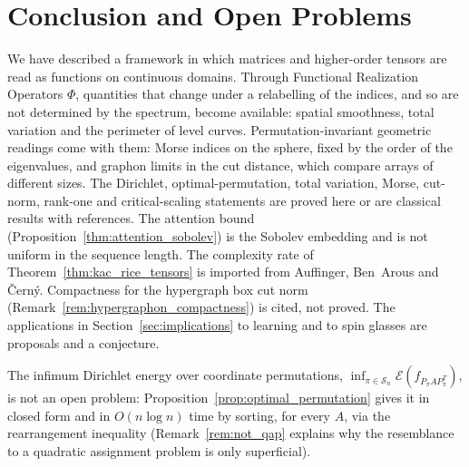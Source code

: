 \documentclass[11pt,a4paper,reqno]{amsart}
\theoremstyle{definition}
\numberwithin{equation}{section}
\begin{document}
\section{Conclusion and Open Problems}
\label{sec:conclusion}

We have described a framework in which matrices and higher-order tensors are read as functions on continuous domains. Through Functional Realization Operators $\Phi$, quantities that change under a relabelling of the indices, and so are not determined by the spectrum, become available: spatial smoothness, total variation and the perimeter of level curves. Permutation-invariant geometric readings come with them: Morse indices on the sphere, fixed by the order of the eigenvalues, and graphon limits in the cut distance, which compare arrays of different sizes. The Dirichlet, optimal-permutation, total variation, Morse, cut-norm, rank-one and critical-scaling statements are proved here or are classical results with references. The attention bound (Proposition~\ref{thm:attention_sobolev}) is the Sobolev embedding and is not uniform in the sequence length. The complexity rate of Theorem~\ref{thm:kac_rice_tensors} is imported from Auffinger, Ben~Arous and \v{C}ern\'y. Compactness for the hypergraph box cut norm (Remark~\ref{rem:hypergraphon_compactness}) is cited, not proved. The applications in Section~\ref{sec:implications} to learning and to spin glasses are proposals and a conjecture.

The infimum Dirichlet energy over coordinate permutations, $\inf_{\pi \in \mathcal{S}_n} \mathcal{E}(f_{P_\pi A P_\pi^T})$, is not an open problem: Proposition~\ref{prop:optimal_permutation} gives it in closed form and in $O(n \log n)$ time by sorting, for every $A$, via the rearrangement inequality (Remark~\ref{rem:not_qap} explains why the resemblance to a quadratic assignment problem is only superficial).
\end{document}

